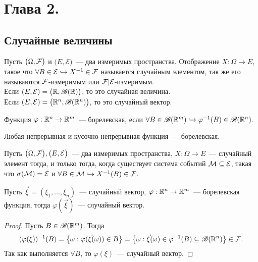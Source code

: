 \section{Глава 2.}
\subsection{Случайные величины}
\begin{definition}
	Пусть $\big(\Omega, \mathcal{F} \big)$ и $\big( E, \mathcal{E} \big)$~--- два измеримых пространства. Отображение $X: \Omega \rightarrow E$, такое что $\forall B \in \mathcal{E} \hookrightarrow X^{-1} \in \mathcal{F}$  называется случайным элементом, так же его называются $\mathcal{F}$-измеримым или $\mathcal{F}|\mathcal{E}$-измеримым. \\
	Если $(E, \mathcal{E}) = \big(\mathbb{R}, \mathscr{B}(\mathbb{R})\big)$, то это случайная величина. \\
	Если $(E, \mathcal{E}) = \big(\mathbb{R}^n, \mathscr{B}(\mathbb{R}^n)\big)$, то это случайный вектор.
\end{definition}

\begin{definition}
	Функция $\varphi: \mathbb{R}^n \rightarrow \mathbb{R}^m$~--- борелевская, если $\forall B \in \mathscr{B}(\mathbb{R}^m) \hookrightarrow \varphi^{-1}(B) \in \mathscr{B}(\mathbb{R}^n)$. 
\end{definition}

\begin{statement}
	Любая непрерывная и кусочно-непрерывная функция~--- борелевская.
\end{statement}

\begin{theorem}
	Пусть $\big(\Omega, \mathcal{F}\big), \big(E, \mathcal{E}\big)$~--- два измеримых пространства, $X: \Omega \rightarrow E$~--- случайный элемент тогда, и только тогда, когда существует система событий $\mathcal{M} \subseteq \mathcal{E}$, такая что $\sigma(\mathcal{M}) = \mathcal{E}$ и $\forall B \in \mathcal{M} \hookrightarrow X^{-1}(B) \in \mathcal{F}$.
\end{theorem}

\begin{lemma}
	Пусть $\vec\xi = (\xi_1, \ldots, \xi_n)$~--- случайный вектор, $\varphi: \mathbb{R}^n \rightarrow \mathbb{R}^m$~--- борелевская функция, тогда $\varphi(\vec\xi)$~--- случайный вектор.
	\begin{proof}
		Пусть $B \in \mathscr{B}(\mathbb{R}^m)$. Тогда 
		$$ (\varphi(\vec\xi))^{-1}(B) = \big\{\omega : \varphi(\vec\xi(\omega)) \in B\big\} = \big\{\omega : \vec\xi(\omega) \in \varphi^{-1}(B) \subseteq \mathscr{B}(\mathbb{R}^n) \big\} \in \mathcal{F}. $$ Так как выполняется $\forall B$, то $\varphi(\xi)$~--- случайный вектор.
	\end{proof}
\end{lemma}

